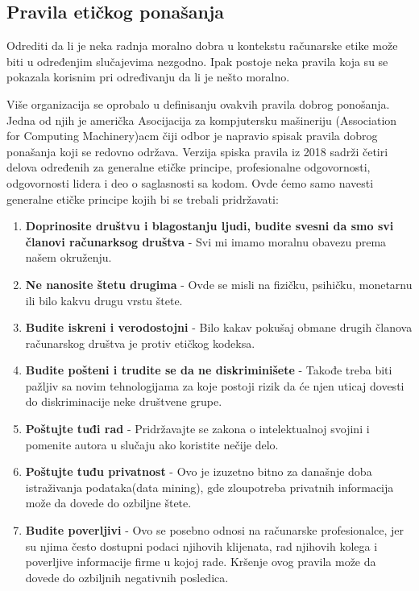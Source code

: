 \documentclass[a4paper]{article}
\begin{document}



\subsection{Pravila etičkog ponašanja}
Odrediti da li je neka radnja moralno dobra u kontekstu računarske etike može biti u određenjim slučajevima nezgodno. Ipak postoje neka pravila koja su se pokazala korisnim pri određivanju da li je nešto moralno.

Više organizacija se oprobalo u definisanju ovakvih pravila dobrog ponošanja.
Jedna od njih je američka Asocijacija za kompjutersku mašineriju (Association for Computing Machinery){acm} čiji odbor je napravio spisak pravila dobrog ponašanja koji se redovno održava. Verzija spiska pravila iz 2018\cite{acm} sadrži četiri delova određenih za generalne etičke principe, profesionalne odgovornosti, odgovornosti lidera i deo o saglasnosti sa kodom. Ovde ćemo samo navesti generalne etičke principe kojih bi se trebali pridržavati:

\begin{enumerate}
	\item \textbf{Doprinosite društvu i blagostanju ljudi, budite svesni da smo svi članovi računarksog društva} - Svi mi imamo moralnu obavezu prema našem okruženju.
	\item \textbf{Ne nanosite štetu drugima} - Ovde se misli na fizičku, psihičku, monetarnu ili bilo kakvu drugu vrstu štete.
	\item \textbf{Budite iskreni i verodostojni} - Bilo kakav pokušaj obmane drugih članova računarskog društva je protiv etičkog kodeksa.
	\item \textbf{Budite pošteni i trudite se da ne diskriminišete} - Takođe treba biti pažljiv sa novim tehnologijama za koje postoji rizik da će njen uticaj dovesti do diskriminacije neke društvene grupe.
	\item \textbf{Poštujte tuđi rad} - Pridržavajte se zakona o intelektualnoj svojini i pomenite autora u slučaju ako koristite nečije delo.
	\item \textbf{Poštujte tuđu privatnost} - Ovo je izuzetno bitno za današnje doba istraživanja podataka(data mining), gde zloupotreba privatnih informacija može da dovede do ozbiljne štete.
	\item \textbf{Budite poverljivi} - Ovo se posebno odnosi na računarske profesionalce, jer su njima često dostupni podaci njihovih klijenata, rad njihovih kolega i poverljive informacije firme u kojoj rade. Kršenje ovog pravila može da dovede do ozbiljnih negativnih posledica.
\end{enumerate}
\end{document}
